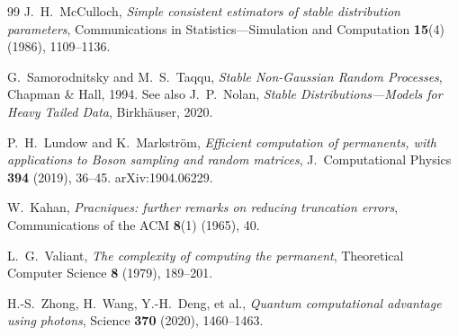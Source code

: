 \documentclass[11pt]{amsart}
\theoremstyle{definition}
\theoremstyle{remark}
\begin{document}
\begin{thebibliography}{99}
J.~H.~McCulloch,
\emph{Simple consistent estimators of stable distribution parameters},
Communications in Statistics---Simulation and Computation
\textbf{15}(4) (1986), 1109--1136.

G.~Samorodnitsky and M.~S.~Taqqu,
\emph{Stable Non-Gaussian Random Processes},
Chapman \& Hall, 1994.
See also J.~P.~Nolan, \emph{Stable Distributions---Models for Heavy
Tailed Data}, Birkh\"auser, 2020.

P.~H.~Lundow and K.~Markstr\"om,
\emph{Efficient computation of permanents, with applications to Boson
sampling and random matrices},
J.\ Computational Physics \textbf{394} (2019), 36--45.
arXiv:1904.06229.

W.~Kahan,
\emph{Pracniques: further remarks on reducing truncation errors},
Communications of the ACM \textbf{8}(1) (1965), 40.

L.~G.~Valiant,
\emph{The complexity of computing the permanent},
Theoretical Computer Science \textbf{8} (1979), 189--201.

H.-S.~Zhong, H.~Wang, Y.-H.~Deng, et al.,
\emph{Quantum computational advantage using photons},
Science \textbf{370} (2020), 1460--1463.

\end{thebibliography}
\end{document}
